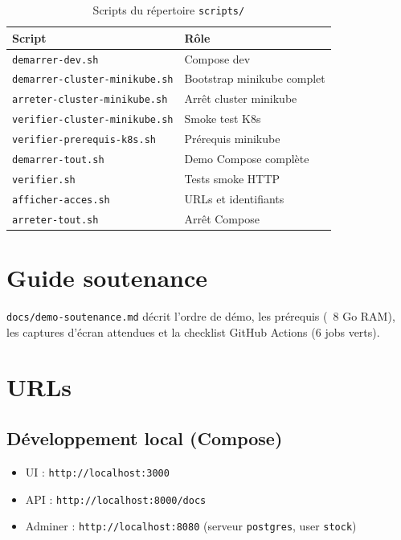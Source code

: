 \begin{table}[htbp]
  \centering
  \caption{Scripts du répertoire \texttt{scripts/}}
  \label{tab:scripts}
  \small
  \begin{tabular}{@{}lp{10cm}@{}}
    \toprule
    \textbf{Script} & \textbf{Rôle} \\
    \midrule
    \texttt{demarrer-dev.sh} & Compose dev \\
    \texttt{demarrer-cluster-minikube.sh} & Bootstrap minikube complet \\
    \texttt{arreter-cluster-minikube.sh} & Arrêt cluster minikube \\
    \texttt{verifier-cluster-minikube.sh} & Smoke test K8s \\
    \texttt{verifier-prerequis-k8s.sh} & Prérequis minikube \\
    \texttt{demarrer-tout.sh} & Demo Compose complète \\
    \texttt{verifier.sh} & Tests smoke HTTP \\
    \texttt{afficher-acces.sh} & URLs et identifiants \\
    \texttt{arreter-tout.sh} & Arrêt Compose \\
    \bottomrule
  \end{tabular}
\end{table}

\section{Guide soutenance}

\texttt{docs/demo-soutenance.md} décrit l'ordre de démo, les prérequis (~8 Go RAM), les captures d'écran attendues et la checklist GitHub Actions (6 jobs verts).

\section{URLs}

\subsection{Développement local (Compose)}

\begin{itemize}
  \item UI : \texttt{http://localhost:3000}
  \item API : \texttt{http://localhost:8000/docs}
  \item Adminer : \texttt{http://localhost:8080} (serveur \texttt{postgres}, user \texttt{stock})
\end{itemize}

